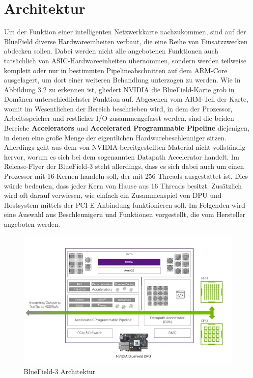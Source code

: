 \section{Architektur}
Um der Funktion einer intelligenten Netzwerkkarte nachzukommen, sind auf der BlueField diverse Hardwareeinheiten verbaut, die eine Reihe von Einsatzzwecken abdecken sollen. Dabei werden nicht alle angebotenen Funktionen auch tatsächlich von ASIC-Hardwareeinheiten übernommen, sondern werden teilweise komplett oder nur in bestimmten Pipelineabschnitten auf dem ARM-Core ausgelagert, um dort einer weiteren Behandlung unterzogen zu werden. Wie in Abbildung 3.2 zu erkennen ist, gliedert NVIDIA die BlueField-Karte grob in Domänen unterschiedlichster Funktion auf. Abgesehen vom ARM-Teil der Karte, womit im Wesentlichen der Bereich beschrieben wird, in dem der Prozessor, Arbeitsspeicher und restlicher I/O zusammengefasst werden, sind die beiden Bereiche \textbf{Accelerators} und \textbf{Accelerated Programmable Pipeline} diejenigen, in denen eine große Menge der eigentlichen Hardwarebeschleuniger sitzen. Allerdings geht aus dem von NVIDIA bereitgestellten Material nicht vollständig hervor, worum es sich bei dem sogenannten Datapath Accelerator handelt. \cite{nvidia_bluefield_dpu}  Im Release-Flyer der BlueField-3 steht allerdings, dass es sich dabei auch um einen Prozessor mit 16 Kernen handeln soll, der mit 256 Threads ausgestattet ist. Dies würde bedeuten, dass jeder Kern von Hause aus 16 Threads besitzt. Zusätzlich wird oft darauf verwiesen, wie einfach ein Zusammenspiel von DPU und Hostsystem mittels der PCI-E-Anbindung funktionieren soll. Im Folgenden wird eine Auswahl aus Beschleunigern und Funktionen vorgestellt, die vom Hersteller  angeboten werden. \cite{nvidia_bluefield_dpu} 
\begin{figure}
    \centering
    \includegraphics[width=1\linewidth]{images/nvda-bluefield-dpu.png}
    \caption{BlueField-3 Architektur \cite{fibermall_bluefield3}}
    \label{fig:enter-label}
\end{figure}
